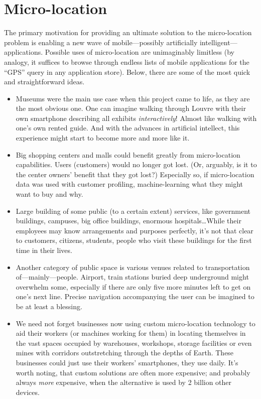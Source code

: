 \chapter{Micro-location}
\label{cha:microlocation}


The primary motivation for providing an ultimate solution to the micro-location problem is enabling a new wave of mobile---possibly artificially intelligent---applications. Possible uses of micro-location are unimaginably limitless (by analogy, it suffices to browse through endless lists of mobile applications for the ``GPS'' query in any application store). Below, there are some of the most quick and straightforward ideas.

\begin{itemize}
	\item Museums were the main use case when this project came to life, as they are the most obvious one. One can imagine walking through Louvre with their own smartphone describing all exhibits \emph{interactively}! Almost like walking with one's own rented guide. And with the advances in artificial intellect, this experience might start to become more and more like it.
	
	\item Big shopping centers and malls could benefit greatly from micro-location capabilities. Users (customers) would no longer got lost. (Or, arguably, is it to the center owners' benefit that they got lost?) Especially so, if micro-location data was used with customer profiling, machine-learning what they might want to buy and why.
	
	\item Large building of some public (to a certain extent) services, like government buildings, campuses, big office buildings, enormous hospitals\ldots While their employees may know arrangements and purposes perfectly, it's not that clear to customers, citizens, students, people who visit these buildings for the first time in their lives.
	
	\item Another category of public space is various venues related to transportation of---mainly---people. Airport, train stations buried deep underground might overwhelm some, especially if there are only five more minutes left to get on one's next line. Precise navigation accompanying the user can be imagined to be at least a blessing.

	\item We need not forget businesses now using custom micro-location technology to aid their workers (or machines working for them) in locating themselves in the vast spaces occupied by warehouses, workshops, storage facilities or even mines with corridors outstretching through the depths of Earth. These businesses could just use their workers' smartphones, they use daily. It's worth noting, that custom solutions are often more expensive; and probably always \emph{more} expensive, when the alternative is used by 2 billion other devices.
\end{itemize}

